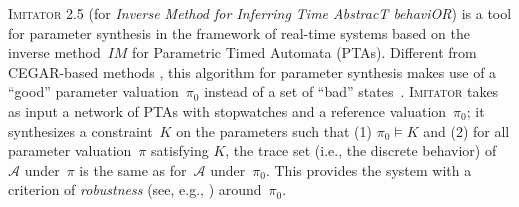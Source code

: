\documentclass{article}
\newcommand{\A}{\mathcal{A}}
\newcommand{\Ko}{K}
\newcommand{\pio}{\pi_0}
\newcommand{\piprime}{\pi}
\newcommand{\IM}{\mathit{IM}}
\newcommand{\hytech}{{\sc HyTech}}
\newcommand{\imitator}{\textsc{Imitator}}
\begin{document}
\imitator{} 2.5 (for \emph{Inverse Method for Inferring Time AbstracT behaviOR}) is a tool for parameter synthesis in the framework of real-time systems based on the inverse method~$\IM$ for Parametric Timed Automata (PTAs).  %
Different from CEGAR-based methods%
, this algorithm for parameter synthesis makes use of a ``good'' parameter valuation~$\pio$ instead of a set of ``bad'' states~\cite{acef09}.
\imitator{} takes as input a network of PTAs with stopwatches
and a reference valuation~$\pio$; it synthesizes a constraint~$\Ko$ on the parameters such that (1) $\pio \models \Ko$ and (2) for all parameter valuation~$\piprime$ satisfying $\Ko$, the trace set (i.e., the discrete behavior) of~$\A$ under~$\piprime$ is the same as for~$\A$ under~$\pio$.
This provides the system with a criterion of \emph{robustness} (see, e.g., \cite{m11})
around~$\pio$.


\end{document}
